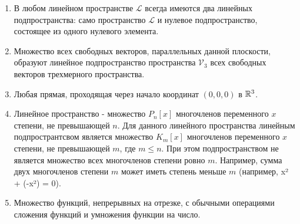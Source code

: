 \begin{enumerate}
    \item В любом линейном пространстве $\mathcal{L}$ всегда имеются два линейных подпространства: само пространство $\mathcal{L}$ и нулевое подпространство, состоящее из одного нулевого элемента.
    \item Множество всех свободных векторов, параллельных данной плоскости, образуют линейное подпространство пространства $\mathcal{V}_3$ всех свободных векторов трехмерного пространства.
    \item Любая прямая, проходящая через начало координат $(0, 0, 0)$ в $\mathbb{R}^3$.
    \item Линейное пространство - множество $P_n[x]$ многочленов переменного $x$ степени, не превышающей $n$. Для данного линейного пространства линейным подпространтсвом является множество $K_m[x]$ многочленов переменного $x$ степени, не превышающей $m$, где $m \leq n$. При этом подпространством не является множество всех многочленов степени ровно $m$. Например, сумма двух многочленов степени $m$ может иметь степень меньше $m$ (например, x² + (-x²) = 0).
    \item Множество функций, непрерывных на отрезке, с обычными операциями сложения функций и умножения функции на число.
\end{enumerate}
